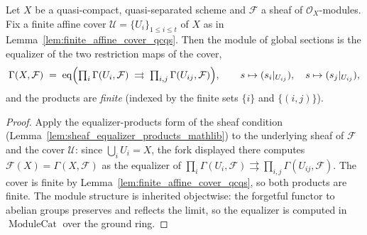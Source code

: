 \begin{lemma}
  \label{lem:gamma_finite_equalizer}
  Let \(X\) be a quasi-compact, quasi-separated scheme and \(\mathcal{F}\) a sheaf of
  \(\mathcal{O}_X\)-modules. Fix a finite affine cover \(\mathcal{U} = \{U_i\}_{1 \le i \le t}\)
  of \(X\) as in Lemma~\ref{lem:finite_affine_cover_qcqs}. Then the module of global
  sections is the equalizer of the two restriction maps of the cover,
  \[
    \Gamma(X, \mathcal{F})
    \;=\;
    \operatorname{eq}\Bigl(
      \textstyle\prod_{i} \Gamma(U_i, \mathcal{F})
      \;\rightrightarrows\;
      \textstyle\prod_{i,j} \Gamma(U_{ij}, \mathcal{F})
    \Bigr),
    \qquad
    s \mapsto (s_i|_{U_{ij}}), \quad s \mapsto (s_j|_{U_{ij}}),
  \]
  and the products are \emph{finite} (indexed by the finite sets \(\{i\}\) and
  \(\{(i,j)\}\)).
  \begin{proof}
    Apply the equalizer-products form of the sheaf condition
    (Lemma~\ref{lem:sheaf_equalizer_products_mathlib}) to the underlying sheaf of
    \(\mathcal{F}\) and the cover \(\mathcal{U}\): since \(\bigcup_i U_i = X\), the
    fork displayed there computes \(\mathcal{F}(X) = \Gamma(X, \mathcal{F})\) as the
    equalizer of \(\prod_i \Gamma(U_i, \mathcal{F}) \rightrightarrows \prod_{i,j}
    \Gamma(U_{ij}, \mathcal{F})\). The cover is finite by
    Lemma~\ref{lem:finite_affine_cover_qcqs}, so both products are finite. The
    module structure is inherited objectwise: the forgetful functor to abelian
    groups preserves and reflects the limit, so the equalizer is computed in
    \(\operatorname{ModuleCat}\) over the ground ring.
  \end{proof}
\end{lemma}




